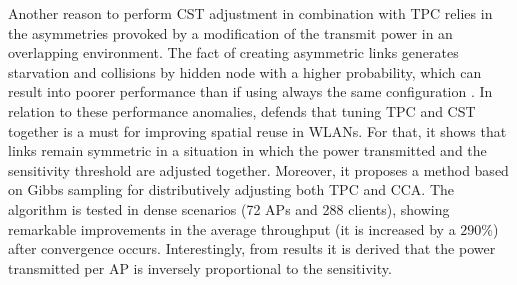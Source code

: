 \documentclass[12pt, a4paper,twoside]{tesi_upf}
\begin{document}
			Another reason to perform CST adjustment in combination with TPC relies in the asymmetries provoked by a modification of the transmit power in an overlapping environment. The fact of creating asymmetric links generates starvation and collisions by hidden node with a higher probability, which can result into poorer performance than if using always the same configuration \cite{kawadia2005principles}. In relation to these performance anomalies, \cite{mhatre2007interference} defends that tuning TPC and CST together is a must for improving spatial reuse in WLANs. For that, it shows that links remain symmetric in a situation in which the power transmitted and the sensitivity threshold are adjusted together. Moreover, it proposes a method based on Gibbs sampling for distributively adjusting both TPC and CCA. The algorithm is tested in dense scenarios (72 APs and 288 clients), showing remarkable improvements in the average throughput (it is increased by a $290\%$) after convergence occurs. Interestingly, from results it is derived that the power transmitted per AP is inversely proportional to the sensitivity.				
			
\end{document}

